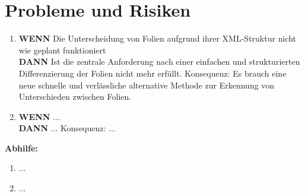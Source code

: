 \section{Probleme und Risiken}
\begin{enumerate}
	\item \textbf{WENN} Die Unterscheidung von Folien aufgrund ihrer XML-Struktur nicht wie geplant funktioniert\\
	      \textbf{DANN} Ist die zentrale Anforderung nach einer einfachen und strukturierten Differenzierung der Folien nicht mehr erfüllt. Konsequenz: Es brauch eine neue schnelle und verlässliche alternative Methode zur Erkennung von Unterschieden zwischen Folien.

	\item \textbf{WENN} ...\\
	      \textbf{DANN} ... Konsequenz: ...
\end{enumerate}

\textbf{Abhilfe:}
\begin{enumerate}
	\item ...
	\item ...
\end{enumerate}
